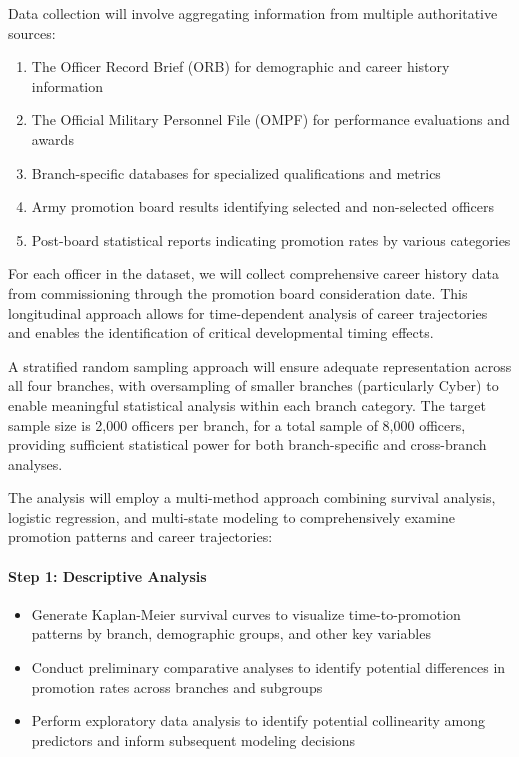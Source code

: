 \documentclass[../main.tex]{subfiles}
\begin{document}
Data collection will involve aggregating information from multiple authoritative sources:
\begin{enumerate}
\item The Officer Record Brief (ORB) for demographic and career history information
\item The Official Military Personnel File (OMPF) for performance evaluations and awards
\item Branch-specific databases for specialized qualifications and metrics
\item Army promotion board results identifying selected and non-selected officers
\item Post-board statistical reports indicating promotion rates by various categories
\end{enumerate}

For each officer in the dataset, we will collect comprehensive career history data from commissioning through the promotion board consideration date. This longitudinal approach allows for time-dependent analysis of career trajectories and enables the identification of critical developmental timing effects.

A stratified random sampling approach will ensure adequate representation across all four branches, with oversampling of smaller branches (particularly Cyber) to enable meaningful statistical analysis within each branch category. The target sample size is 2,000 officers per branch, for a total sample of 8,000 officers, providing sufficient statistical power for both branch-specific and cross-branch analyses.


The analysis will employ a multi-method approach combining survival analysis, logistic regression, and multi-state modeling to comprehensively examine promotion patterns and career trajectories:

\paragraph{Step 1: Descriptive Analysis}
\begin{itemize}
\item Generate Kaplan-Meier survival curves to visualize time-to-promotion patterns by branch, demographic groups, and other key variables
\item Conduct preliminary comparative analyses to identify potential differences in promotion rates across branches and subgroups
\item Perform exploratory data analysis to identify potential collinearity among predictors and inform subsequent modeling decisions
\end{itemize}
\end{document}
